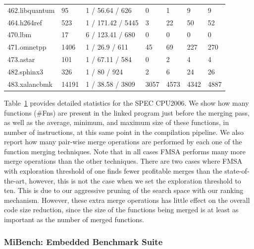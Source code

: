 \begin{table}[h]
{\begin{tabular}{lllllll}
                     462.libquantum     & 95     & 1 / 56.64 / 626    & \small 0      & \small 1     & \small 9    & \small 9    \\
\rowcolor{evencolor} 464.h264ref        & 523    & 1 / 171.42 / 5445  & \small 3      & \small 22    & \small 50   & \small 52   \\
                     470.lbm            & 17     & 6 / 123.41 / 680   & \small 0      & \small 0     & \small 0    & \small 0    \\
\rowcolor{evencolor} 471.omnetpp        & 1406   & 1 / 26.9 / 611     & \small 45     & \small 69    & \small 227  & \small 270  \\
                     473.astar          & 101    & 1 / 67.11 / 584    & \small 0      & \small 2     & \small 4    & \small 4    \\
\rowcolor{evencolor} 482.sphinx3        & 326    & 1 / 80 / 924       & \small 2      & \small 6     & \small 24   & \small 26   \\
                     483.xalancbmk      & 14191  & 1 / 38.58 / 3809   & \small 3057   & \small 4573  & \small 4342 & \small 4887 \\
\bottomrule
\end{tabular}
}
\label{tab:stats}
\end{table}

Table~\ref{tab:stats} provides detailed statistics for the SPEC CPU2006.
We show how many functions (\#Fns) are present in the linked program
just before the merging pass, as well as
the average, minimum, and maximum size of these functions, in number of instructions, at
this same point in the compilation pipeline.
We also report how many pair-wise merge operations are
performed by each one of the function merging techniques.
Note that in all cases FMSA performs many more merge operations than the other
techniques.
There are two cases where FMSA with exploration threshold of one finds fewer
profitable merges than the state-of-the-art, however, this is not the case when
we set the exploration threshold to ten.
This is due to our aggressive pruning of the search space with our ranking
mechanism.
However, these extra merge operations has little effect on the overall code size reduction,
since the size of the functions being merged is at least as important as the number of merged functions.

\subsubsection*{MiBench: Embedded Benchmark Suite}

